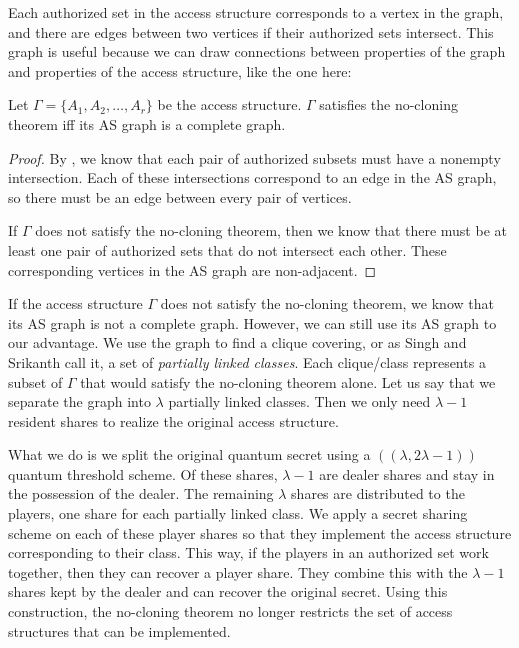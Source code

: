 Each authorized set in the access structure corresponds to a vertex in the graph, and there are edges between two vertices if their authorized sets intersect. This graph is useful because we can draw connections between properties of the graph and properties of the access structure, like the one here:

\begin{proposition}
    \label{prop:complete-as-graph}
    Let $\Gamma = \{A_1,A_2,\dots,A_r\}$ be the access structure. $\Gamma$ satisfies the no-cloning theorem iff its AS graph is a complete graph.
\end{proposition}

\begin{proof}
    By , we know that each pair of authorized subsets must have a nonempty intersection. Each of these intersections correspond to an edge in the AS graph, so there must be an edge between every pair of vertices.
    
    If $\Gamma$ does not satisfy the no-cloning theorem, then we know that there must be at least one pair of authorized sets that do not intersect each other. These corresponding vertices in the AS graph are non-adjacent.
\end{proof}

If the access structure $\Gamma$ does not satisfy the no-cloning theorem, we know that its AS graph is not a complete graph. However, we can still use its AS graph to our advantage. We use the graph to find a clique covering, or as Singh and Srikanth call it, a set of \textit{partially linked classes}. Each clique/class represents a subset of $\Gamma$ that would satisfy the no-cloning theorem alone. Let us say that we separate the graph into $\lambda$ partially linked classes. Then we only need $\lambda - 1$ resident shares to realize the original access structure. 

What we do is we split the original quantum secret using a $((\lambda, 2 \lambda - 1))$ quantum threshold scheme. Of these shares, $\lambda-1$ are dealer shares and stay in the possession of the dealer. The remaining $\lambda$ shares are distributed to the players, one share for each partially linked class. We apply a secret sharing scheme on each of these player shares so that they implement the access structure corresponding to their class. This way, if the players in an authorized set work together, then they can recover a player share. They combine this with the $\lambda-1$ shares kept by the dealer and can recover the original secret. Using this construction, the no-cloning theorem no longer restricts the set of access structures that can be implemented.

